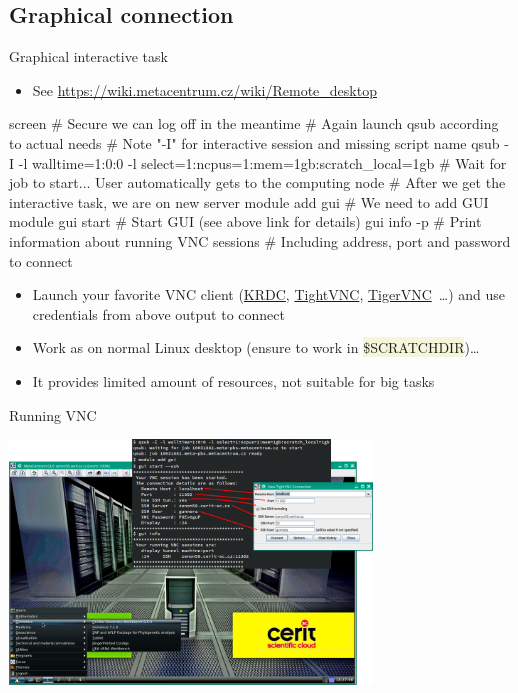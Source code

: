 \documentclass[compress, ucs, xelatex, 11pt, xcolor=svgnames, aspectratio=169,
	hyperref={
		bookmarks=true,
		unicode=true,
		colorlinks=true,
		pdftitle={Linux, command line and MetaCentrum},
		plainpages=false,
		pdfauthor={Vojtech Zeisek},
		pdfsubject={Course about use of Linux command line, writing shell scripts and using MetaCentrum of CESNET},
		pdfcreator={XeLaTeX},
		pdfkeywords={Linux, GNU, BASH, shell, command line, MetaCentrum},
		linkcolor=DarkRed, %
		anchorcolor=DarkBlue, %
		citecolor=Indigo, %
		filecolor=NavyBlue, %
		menucolor=DarkMagenta, %
		urlcolor=DarkBlue, %
		pdftex},
	url={hyphens, lowtilde} %
	]{beamer}
\renewcommand{\texttt}[1]{\colorbox{Beige}{{\ttfamily #1}}}
\begin{document}
\subsection{Graphical connection}

\begin{frame}[fragile]{Graphical interactive task}
	\begin{itemize}
		\item See \url{https://wiki.metacentrum.cz/wiki/Remote_desktop}
	\end{itemize}
	\begin{bashcode}
    screen # Secure we can log off in the meantime
    # Again launch qsub according to actual needs
    # Note "-I" for interactive session and missing script name
    qsub -I -l walltime=1:0:0 -l select=1:ncpus=1:mem=1gb:scratch_local=1gb
    # Wait for job to start... User automatically gets to the computing node
    # After we get the interactive task, we are on new server
    module add gui # We need to add GUI module
    gui start # Start GUI (see above link for details)
    gui info -p # Print information about running VNC sessions
                # Including address, port and password to connect
	\end{bashcode}
	\begin{itemize}
		\item Launch your favorite VNC client (\href{https://apps.kde.org/en/krdc}{KRDC}, \href{https://www.tightvnc.com/}{TightVNC}, \href{https://tigervnc.org/}{TigerVNC}~\ldots) and use credentials from above output to connect
		\item Work as on normal Linux desktop (ensure to work in \texttt{\$SCRATCHDIR})\ldots
		\item It provides limited amount of resources, not suitable for big tasks
	\end{itemize}
\end{frame}

\begin{frame}{Running VNC}
	\begin{center}
		\includegraphics[height=6.5cm]{vnc.png}
	\end{center}
\end{frame}
\end{document}
